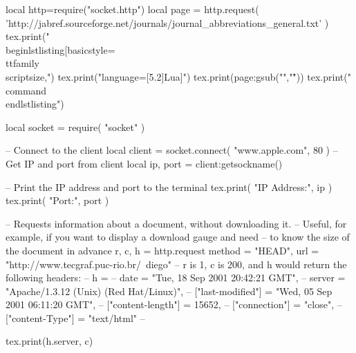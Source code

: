 \documentclass[]{article}
\begin{document}
\begin{luacode*}
    local http=require("socket.http")
    local page = http.request( 'http://jabref.sourceforge.net/journals/journal_abbreviations_general.txt' )
    tex.print("\\begin{lstlisting}[basicstyle=\\ttfamily\\scriptsize,")
    tex.print("language={[5.2]Lua}]")
    tex.print(page:gsub("\n","\r"))
    tex.print("\\command \\end{lstlisting}")
    
 local socket = require( "socket" )

-- Connect to the client
local client = socket.connect( "www.apple.com", 80 )
-- Get IP and port from client
local ip, port = client:getsockname()

-- Print the IP address and port to the terminal
tex.print( "IP Address:", ip )
tex.print( "Port:", port )   


-- Requests information about a document, without downloading it.
-- Useful, for example, if you want to display a download gauge and need
-- to know the size of the document in advance
r, c, h = http.request {
  method = "HEAD",
  url = "http://www.tecgraf.puc-rio.br/~diego"
}
-- r is 1, c is 200, and h would return the following headers:
-- h = {
--   date = "Tue, 18 Sep 2001 20:42:21 GMT",
--   server = "Apache/1.3.12 (Unix)  (Red Hat/Linux)",
--   ["last-modified"] = "Wed, 05 Sep 2001 06:11:20 GMT",
--   ["content-length"] = 15652,
--   ["connection"] = "close",
--   ["content-Type"] = "text/html"
-- }

tex.print(h.server, c)



\end{luacode*}
\end{document}
